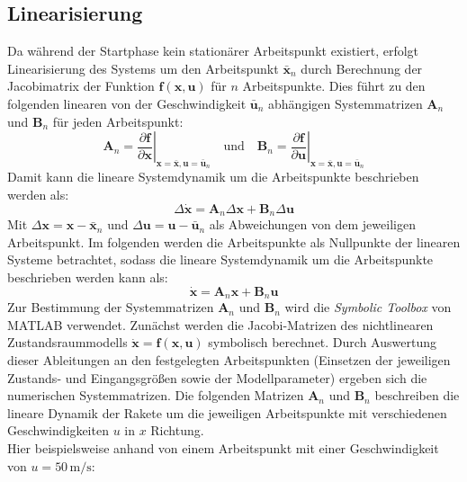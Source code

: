 \subsection{Linearisierung}
\label{subsec:linearisierung}
Da während der Startphase kein stationärer Arbeitspunkt existiert, erfolgt Linearisierung des Systems um den Arbeitspunkt $\bar{\mathbf{x}}_n$ durch Berechnung der Jacobimatrix der Funktion $\mathbf{f}(\mathbf{x}, \mathbf{u})$ für $n$ Arbeitspunkte. Dies führt zu den folgenden linearen von der Geschwindigkeit $\bar{\mathbf{u}}_n$ abhängigen Systemmatrizen $\mathbf{A}_n$ und $\mathbf{B}_n$ für jeden Arbeitspunkt:
\begin{equation}
\mathbf{A}_n = \left. \frac{\partial \mathbf{f}}{\partial \mathbf{x}} \right|_{\mathbf{x} = \bar{\mathbf{x}}, \mathbf{u} = \bar{\mathbf{u}}_n}
\quad \text{und} \quad
\mathbf{B}_n = \left. \frac{\partial \mathbf{f}}{\partial \mathbf{u}} \right|_{\mathbf{x} = \bar{\mathbf{x}}, \mathbf{u} = \bar{\mathbf{u}}_n}
\end{equation}
Damit kann die lineare Systemdynamik um die Arbeitspunkte beschrieben werden als:
\begin{equation}
\Delta\dot{\mathbf{x}} = \mathbf{A}_n \Delta\mathbf{x} + \mathbf{B}_n \Delta\mathbf{u}
\end{equation}
Mit $\Delta\mathbf{x} = \mathbf{x} - \bar{\mathbf{x}}_n$ und $\Delta\mathbf{u} = \mathbf{u} - \bar{\mathbf{u}}_n$ als Abweichungen von dem jeweiligen Arbeitspunkt. Im folgenden werden die Arbeitspunkte als Nullpunkte der linearen Systeme betrachtet, sodass die lineare Systemdynamik um die Arbeitspunkte beschrieben werden kann als:
\begin{equation}
\dot{\mathbf{x}} = \mathbf{A}_n \mathbf{x} + \mathbf{B}_n \mathbf{u}
\end{equation}
Zur Bestimmung der Systemmatrizen $\mathbf{A}_n$ und $\mathbf{B}_n$ wird die \textit{Symbolic Toolbox} von MATLAB verwendet. Zun\"achst werden die Jacobi-Matrizen des nichtlinearen Zustandsraummodells $\dot{\mathbf{x}}=\mathbf{f}(\mathbf{x},\mathbf{u})$ symbolisch berechnet. Durch Auswertung dieser Ableitungen an den festgelegten Arbeitspunkten (Einsetzen der jeweiligen Zustands- und Eingangsgrößen sowie der Modellparameter) ergeben sich die numerischen Systemmatrizen. Die folgenden Matrizen $\mathbf{A}_n$ und $\mathbf{B}_n$ beschreiben die lineare Dynamik der Rakete um die jeweiligen Arbeitspunkte mit verschiedenen Geschwindigkeiten $u$ in $x$ Richtung.
\\
Hier beispielsweise anhand von einem Arbeitspunkt mit einer Geschwindigkeit von $u = 50\,\mathrm{m/s}$:
